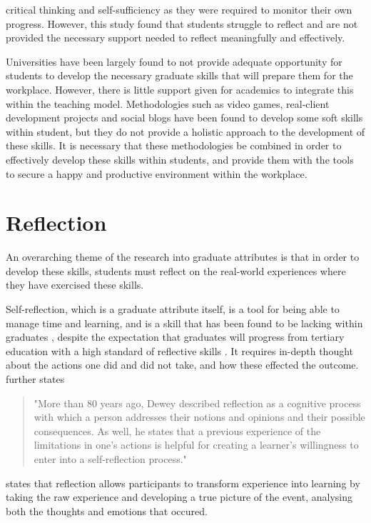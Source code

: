 \documentclass{l4proj}
\begin{document}
critical thinking and self-sufficiency as they were required to monitor their own progress. 
However, this study found that students struggle to reflect and are not provided the necessary 
support needed to reflect meaningfully and effectively. 
\par 
Universities have been largely found to not provide adequate opportunity for students to 
develop the necessary graduate skills that will prepare them for the workplace. However, there is 
little support given for academics to integrate this within the teaching model. Methodologies such 
as video games, real-client development projects and social blogs have been found to develop some 
soft skills within student, but they do not provide a holistic approach to the development of 
these skills. It is necessary that these methodologies be combined in order to effectively 
develop these skills within students, and provide them with the tools to secure a happy and 
productive environment within the workplace.

\section{Reflection}

An overarching theme of the research into graduate attributes is that in order to develop these skills, students must reflect on the real-world 
experiences where they have exercised these skills. 

Self-reflection, which is a graduate attribute itself, is a tool for being able to manage time and learning, and is a skill that has
been found to be lacking within graduates \citep{thurner_development_2020}, despite the expectation that graduates will progress from tertiary 
education with a high standard of reflective skills \citep{bruno_reflective_2018}. It requires in-depth thought about the actions one did and did 
not take, and how these effected the outcome. \citet{thurner_development_2020} further states 
\begin{quotation}
    "More than 80 years ago, Dewey described reflection as a cognitive process with which a person addresses their notions and opinions and their 
    possible consequences. As well, he states that a previous experience of the limitations in one’s actions is helpful for creating a learner’s 
    willingness to enter into a self-reflection process."
\end{quotation}

\citet{boud_using_2001} states that reflection allows participants to transform experience into learning by taking the raw experience and developing a true
picture of the event, analysing both the thoughts and emotions that occured. 
\end{document}
